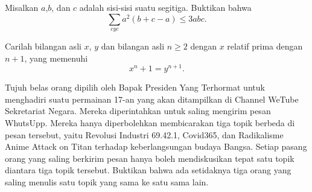 \documentclass[12pt]{scrartcl}
\begin{document}
	\begin{soalbaru}
	Misalkan $a$,$b$, dan $c$ adalah sisi-sisi suatu segitiga. Buktikan bahwa$$\sum_{cyc} a^2(b+c-a) \le 3abc.$$
	\end{soalbaru}
	
	\begin{soalbaru}
	Carilah bilangan asli $x$, $y$ dan bilangan asli $n \ge 2$ dengan $x$ relatif prima dengan $n+1$, yang memenuhi $$x^n+1=y^{n+1}.$$
	\end{soalbaru}
	
	\begin{soalbaru}
	Tujuh belas orang dipilih oleh Bapak Presiden Yang Terhormat untuk menghadiri suatu permainan 17-an yang akan ditampilkan di Channel WeTube Sekretariat Negara. Mereka diperintahkan untuk saling mengirim pesan WhutsUpp. Mereka hanya diperbolehkan membicarakan tiga topik berbeda di pesan tersebut, yaitu Revolusi Industri 69.42.1, Covid365, dan Radikalisme Anime Attack on Titan terhadap keberlangsungan budaya Bangsa. Setiap pasang orang yang saling berkirim pesan hanya boleh mendiskusikan tepat satu topik diantara tiga topik tersebut. Buktikan bahwa ada setidaknya tiga orang yang saling menulis satu topik yang sama ke satu sama lain.
	\end{soalbaru}
\end{document}
